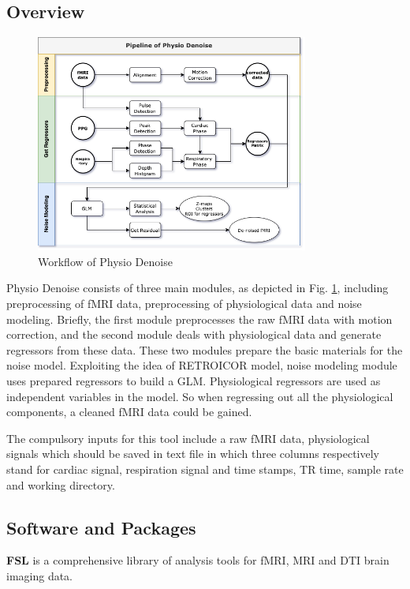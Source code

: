 \subsection{Overview}

\begin{figure}
    \centering
    \includegraphics[width=0.8\textwidth]{Figures/pipe.png}
    \caption{Workflow of Physio Denoise}
    \label{fig:modules}
\end{figure} 

Physio Denoise consists of three main modules, as depicted in Fig. \ref{fig:modules}, 
including preprocessing of fMRI data, preprocessing of physiological data  and noise modeling.
Briefly, the first module preprocesses the raw fMRI data with motion correction, 
and the second module deals with physiological data and generate regressors
from these data. 
These two modules prepare the basic materials for the noise model. 
Exploiting the idea of RETROICOR model, 
noise modeling module uses prepared regressors to build a GLM.
Physiological regressors are used as independent variables in the model. 
So when regressing out all the physiological components, a cleaned fMRI data could be gained. 

The compulsory inputs for this tool include a raw fMRI data, 
physiological signals which should be saved in text file in which three columns respectively stand for cardiac signal, 
respiration signal and time stamps,
TR time, sample rate and working directory.

\subsection{Software and Packages}

\textbf{FSL} is a comprehensive library of analysis tools for fMRI, MRI and DTI brain imaging data.

